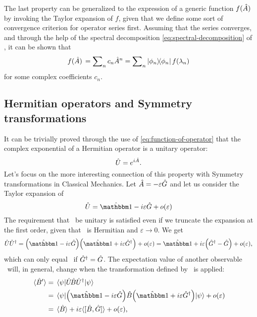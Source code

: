             The last property can be generalized to the expression of a generic function $f\pqty*{\hA}$ by invoking the Taylor expansion of $f$, given that we define some sort of convergence criterion for operator series first. Assuming that the series converges, and through the help of the spectral decomposition \eqref{eq:spectral-decomposition} of \hA, it can be shown that
            \begin{equation}
                \label{eq:function-of-operator}
                f\pqty*{\hA} = \sum\nolimits_n c_n \hA^n = \sum\nolimits_n \dyad{\phi_n}{\phi_n} f\pqty{\lambda_n}
            \end{equation}
            for some complex coefficients $c_n$.
        \subsection{Hermitian operators and Symmetry transformations}\label{ss:unitary-transformations}
            It can be trivially proved \cite{Bernardini1993-iy} through the use of \eqref{eq:function-of-operator} that the complex exponential of a Hermitian operator is a unitary operator:
            \begin{equation*}
                \hat{U} = e^{i\hat{A}}
                \text{.}
            \end{equation*}
            Let's focus on the more interesting connection of this property with Symmetry transformations in Classical Mechanics. Let $\hat{A} = -\varepsilon\hat{G}$ and let us consider the Taylor expansion of \hU
            \begin{equation*}
                \hU = \hidM - i\varepsilon\hG + o\pqty{\varepsilon}
            \end{equation*}
            The requirement that \hU\ be unitary is satisfied even if we truncate the expansion at the first order, given that \hG\ is Hermitian and $\varepsilon \to 0$. We get
            \begin{equation*}
                \hU\hU^\dag = \pqty{\hidM - i\varepsilon\hG}\pqty{\hidM + i\varepsilon\hG^\dag} + o\pqty{\varepsilon} = \hidM + i\varepsilon\pqty{\hG^\dag - \hG} + o\pqty{\varepsilon}
                \mycomma
            \end{equation*}
            which can only equal \hidM\ if $\hat{G}^\dag = \hat{G}$. The expectation value of another observable \hB\ will, in general, change when the transformation defined by \hU\ is applied:
            \begin{align*}
                \expval*{\hB'} &= \mel{\psi}{\hU\!\hB\hU^\dag}{\psi} \\
                &= \mel{\psi}{\pqty{\hidM - i\varepsilon\hG} \hB \pqty{\hidM + i\varepsilon\hG^\dag}}{\psi} + o\pqty{\varepsilon} \\
                &= \expval*{\hB} + i\varepsilon\!\expval*{\comm*{\hB}{\hG}\!} + o\pqty{\varepsilon}
                \mycomma
            \end{align*}

